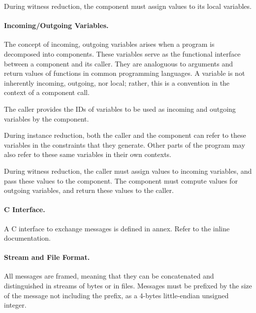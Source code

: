 	During witness reduction, the component must assign values to its local variables.

\paragraph{Incoming/Outgoing Variables.}

	The concept of incoming, outgoing variables arises when a program is decomposed into components.
	These variables serve as the functional interface between a component and its caller.
	They are analoguous to arguments and return values of functions in common programming languages.
	A variable is not inherently incoming, outgoing, nor local;
	rather, this is a convention in the context of a component call.

	The caller provides the IDs of variables to be used as incoming and outgoing variables by the component.

	During instance reduction, both the caller and the component can refer to
	these variables in the constraints that they generate.
	Other parts of the program may also refer to these same variables in their own contexts.

	During witness reduction, the caller must assign values to incoming variables,
	and pass these values to the component.
	The component must compute values for outgoing variables, and return these values to the caller.

\paragraph{C Interface.}

	A C interface to exchange messages is defined in annex.
	Refer to the inline documentation.

\paragraph{Stream and File Format.}

	All messages are framed, meaning that they can be concatenated and distinguished in streams of bytes or in files.
	Messages must be prefixed by the size of the message not including the prefix,
	as a 4-bytes little-endian unsigned integer.
